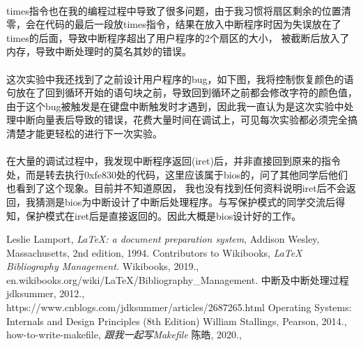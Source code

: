 \documentclass[a4paper, 11pt]{article} %
\begin{document}
\paragraph{}
times指令也在我的编程过程中导致了很多问题，由于我习惯将扇区剩余的位置清零，会在代码的最后一段放times指令，结果在放入中断程序时因为失误放在了times的后面，导致中断程序超出了用户程序的2个扇区的大小，
被截断后放入了内存，导致中断处理时的莫名其妙的错误。
\paragraph{}
这次实验中我还找到了之前设计用户程序的bug，如下图，我将控制恢复颜色的语句放在了回到循环开始的语句块之前，导致回到循环之前都会修改字符的颜色值，
由于这个bug被触发是在键盘中断触发时才遇到，因此我一直认为是这次实验中处理中断向量表后导致的错误，花费大量时间在调试上，可见每次实验都必须完全搞清楚才能更轻松的进行下一次实验。
\paragraph{}
在大量的调试过程中，我发现中断程序返回(iret)后，并非直接回到原来的指令处，而是转去执行0xfe830处的代码，这里应该属于bios的，问了其他同学后他们也看到了这个现象。目前并不知道原因，
我也没有找到任何资料说明iret后不会返回，我猜测是bios为中断设计了中断后处理程序。与写保护模式的同学交流后得知，保护模式在iret后是直接返回的。因此大概是bios设计好的工作。



\begin{thebibliography}{99}
  
  Leslie Lamport,
  \textit{\LaTeX: a document preparation system},
  Addison Wesley, Massachusetts,
  2nd edition,
  1994.
  Contributors to Wikibooks,
  \textit{LaTeX Bibliography Management.}
  Wikibooks,
  2019., \\
  en.wikibooks.org/wiki/LaTeX/Bibliography\_Management.
  中断及中断处理过程
  jdksummer,
  2012., \\
  https://www.cnblogs.com/jdksummer/articles/2687265.html
  Operating Systems: Internals and Design Principles (8th Edition)
  William Stallings,
  Pearson,
  2014., \\
  how-to-write-makefile,
  \textit{跟我一起写Makefile}
  陈皓,
  2020., \\
 
\end{thebibliography}
\end{document}
